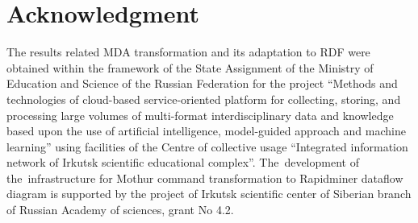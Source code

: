 \documentclass[a4paper]{jpconf}
\begin{document}
\section*{Acknowledgment}
The results related MDA transformation and its adaptation to RDF were obtained within the framework of the State Assignment of the Ministry of Education and Science of the Russian Federation for the project ``Methods and technologies of cloud-based service-oriented platform for collecting, storing, and processing large volumes of multi-format interdisciplinary data and knowledge based upon the use of artificial intelligence, model-guided approach and machine learning'' using facilities of the Centre of collective usage ``Integrated information network of Irkutsk scientific educational complex''. The~development of the~infrastructure for Mothur command transformation to Rapidminer dataflow diagram is supported by the project of Irkutsk scientific center of Siberian branch of Russian Academy of sciences, grant No 4.2.






\end{document}
